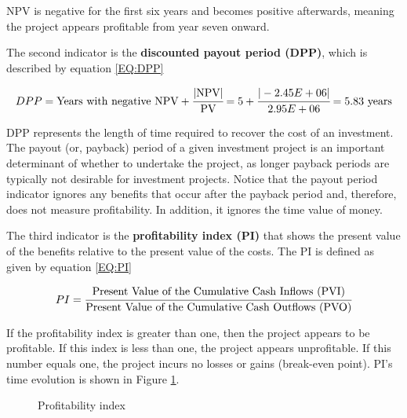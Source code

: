 	NPV is negative for the first six years and becomes positive afterwards, meaning the project appears profitable from year seven onward.
	
	The second indicator is the \textbf{discounted payout period (DPP)}, which is described by equation \ref{EQ:DPP}
	
	{\footnotesize
	\begin{equation}
		DPP = \text{Years with negative NPV} + \cfrac{\text{|NPV|}}{\text{PV}} = 5 + \cfrac{|-2.45E+06|}{2.95E+06} = 5.83~\text{years}
		\label{EQ:DPP}
	\end{equation} }

	DPP	represents the length of time required to recover the cost of an investment. The payout (or, payback) period of a given investment project is an important determinant of whether to undertake the project, as longer payback periods are typically not desirable for investment projects. Notice that the payout period indicator ignores any benefits that occur after the payback period and, therefore, does not measure profitability. In addition, it ignores the time value of money.
	
	The third indicator is the \textbf{profitability index (PI)} that shows the present value of the benefits relative to the present value	of the costs. The PI is defined as given by equation \ref{EQ:PI}
	
	\begin{equation}
		PI = \cfrac{\text{Present Value of the Cumulative Cash Inflows (PVI)}}{\text{Present Value of the Cumulative Cash Outflows (PVO)}}
		\label{EQ:PI}
	\end{equation}
	
	If the profitability index is greater than one, then the project appears to be profitable. If this index is less than one, the project appears unprofitable. If this number equals one, the project incurs no losses or gains (break-even point). PI's time evolution is shown in Figure \ref{fig:PI}.
	
	\begin{figure}[h!]
		\centering
		\caption{Profitability index}
		\label{fig:PI}
	\end{figure}

